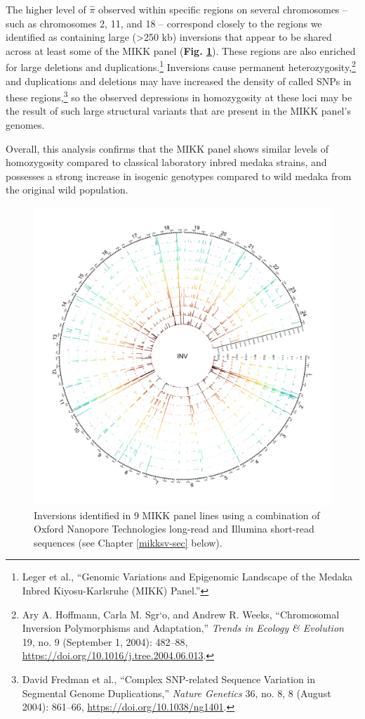 \documentclass[
  9pt,
]{book}
\begin{document}
The higher level of \(\hat{\pi}\) observed within specific regions on several chromosomes -- such as chromosomes 2, 11, and 18 -- correspond closely to the regions we identified as containing large (\textgreater250 kb) inversions that appear to be shared across at least some of the MIKK panel (\textbf{Fig. \ref{fig:SVInvs}}). These regions are also enriched for large deletions and duplications.\footnote{Leger et al., {``Genomic Variations and Epigenomic Landscape of the {Medaka Inbred Kiyosu-Karlsruhe} ({MIKK}) Panel.''}} Inversions cause permanent heterozygosity,\footnote{Ary A. Hoffmann, Carla M. Sgr`o, and Andrew R. Weeks, {``Chromosomal Inversion Polymorphisms and Adaptation,''} \emph{Trends in Ecology \& Evolution} 19, no. 9 (September 1, 2004): 482--88, \url{https://doi.org/10.1016/j.tree.2004.06.013}.} and duplications and deletions may have increased the density of called SNPs in these regions,\footnote{David Fredman et al., {``Complex {SNP-related} Sequence Variation in Segmental Genome Duplications,''} \emph{Nature Genetics} 36, no. 8, 8 (August 2004): 861--66, \url{https://doi.org/10.1038/ng1401}.} so the observed depressions in homozygosity at these loci may be the result of such large structural variants that are present in the MIKK panel's genomes.

Overall, this analysis confirms that the MIKK panel shows similar levels of homozygosity compared to classical laboratory inbred medaka strains, and possesses a strong increase in isogenic genotypes compared to wild medaka from the original wild population.



\begin{figure}
\includegraphics[width=1\linewidth]{figs/mikk_genome/20210224_sv_invs_lines} \caption{Inversions identified in 9 MIKK panel lines using a combination of Oxford Nanopore Technologies long-read and Illumina short-read sequences (see Chapter \ref{mikksv-sec} below).}\label{fig:SVInvs}
\end{figure}
\end{document}
